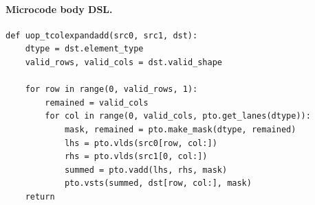 \paragraph{Microcode body DSL.}
\begin{lstlisting}[style=ptocode]
def uop_tcolexpandadd(src0, src1, dst):
    dtype = dst.element_type
    valid_rows, valid_cols = dst.valid_shape

    for row in range(0, valid_rows, 1):
        remained = valid_cols
        for col in range(0, valid_cols, pto.get_lanes(dtype)):
            mask, remained = pto.make_mask(dtype, remained)
            lhs = pto.vlds(src0[row, col:])
            rhs = pto.vlds(src1[0, col:])
            summed = pto.vadd(lhs, rhs, mask)
            pto.vsts(summed, dst[row, col:], mask)
    return
\end{lstlisting}
\Needspace{0.34\textheight}

